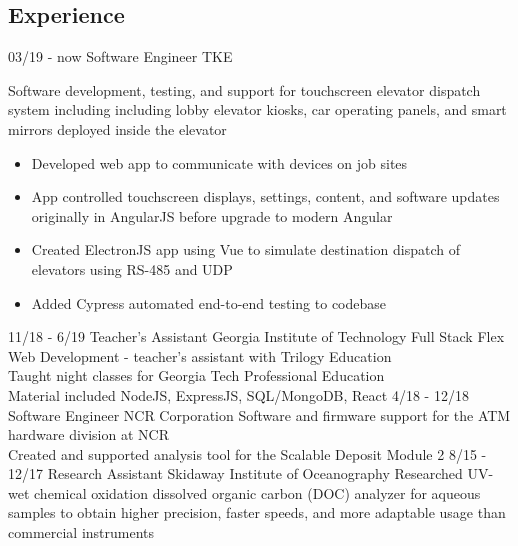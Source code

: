\documentclass[]{cv}
\begin{document}
\begin{body}
	\section{Experience}
	\begin{entrylist}
		\entry
		{03/19 - now}
		{Software Engineer}
		{TKE}
		{Software development, testing, and support for touchscreen elevator dispatch system including including lobby elevator kiosks, car operating panels, and smart mirrors deployed inside the elevator
			\begin{itemize}
				\item {Developed web app to communicate with devices on job sites}
				\item {App controlled touchscreen displays, settings, content, and software updates originally in AngularJS before upgrade to modern Angular}
				\item {Created ElectronJS app using Vue to simulate destination dispatch of elevators using RS-485 and UDP}
				\item {Added Cypress automated end-to-end testing to codebase}
			\end{itemize}
		}
		\entry
		{11/18 - 6/19}
		{Teacher's Assistant}
		{Georgia Institute of Technology}
		{Full Stack Flex Web Development - teacher's assistant with Trilogy Education\\
			Taught night classes for Georgia Tech Professional Education\\
			Material included NodeJS, ExpressJS, SQL/MongoDB, React}
		\entry
		{4/18 - 12/18}
		{Software Engineer}
		{NCR Corporation}
		{Software and firmware support for the ATM hardware division at NCR \\
			Created and supported analysis tool for the Scalable Deposit Module 2}
		\entry
		{8/15 - 12/17}
		{Research Assistant}
		{Skidaway Institute of Oceanography}
		{Researched UV-wet chemical oxidation dissolved organic carbon (DOC) analyzer for aqueous samples to obtain higher precision, faster speeds, and more adaptable usage than commercial instruments
}
\end{entrylist}
\end{body}
\end{document}
